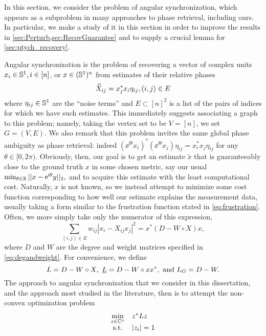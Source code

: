 In this section, we consider the problem of angular synchronization, which appears as a subproblem in many approaches to phase retrieval, including ours.  In particular, we make a study of it in this section in order to improve the results in \cref{sec:Perturb,sec:RecovGuarantee} and to supply a crucial lemma for \cref{sec:ptych_recovery}.

Angular synchronization is the problem of recovering a vector of complex units $x_i \in \mathbb{S}^1, i \in [n]$, or $x \in (\mathbb{S}^1)^n$ from estimates of their relative phases \[\widetilde{X}_{ij} = x_j^* x_i \eta_{ij}, (i, j) \in E\] where $\eta_{ij} \in \mathbb{S}^1$ are the ``noise terms'' and $E \subset [n]^2$ is a list of the pairs of indices for which we have such estimates.  This immediately suggests associating a graph to this problem; namely, taking the vertex set to be $V = [n]$, we set $G = (V, E)$.  We also remark that this problem invites the same global phase ambiguity as phase retrieval: indeed $(\ee^{\ii \theta} x_i)^* (\ee^{\ii \theta} x_j) \eta_{ij} = x_i^* x_j \eta_{ij}$ for any $\theta \in [0, 2\pi)$.  Obviously, then, our goal is to get an estimate $\tilde{x}$ that is guaranteeably close to the ground truth $x$ in some chosen metric, say our usual $\min_{\theta \in \mathbb{R}} || x - \mathrm{e}^{\mathrm{i} \theta} y ||_2,$ and to acquire this estimate with the least computational cost.  Naturally, $x$ is not known, so we instead attempt to minimize some cost function corresponding to how well our estimate explains the measurement data, usually taking a form similar to the frustration function stated in \eqref{eq:frustration}.  Often, we more simply take only the numerator of this expression, \begin{equation} \sum_{(i, j) \in E} w_{ij} |x_i - X_{ij} x_j|^2 = x^* (D - W \circ X) x, \label{eq:ang_sync_cost} \end{equation} where $D$ and $W$ are the degree and weight matrices specified in \eqref{eq:degandweight}.  For convenience, we define \begin{equation} L = D - W \circ X, \ \underline{L} = D - W \circ x x^*, \ \text{and} \ L_G = D - W. \label{eq:L_defs} \end{equation}  The approach to angular synchronization that we consider in this dissertation, and the approach most studied in the literature, then is to attempt the non-convex optimization problem \begin{equation} \begin{array}{cl} \min\limits_{z \in \mathbb{C}^n} & z^* L z \\ \text{s.t.} & |z_i| = 1 \end{array} \label{eq:ang_sync}\end{equation}

